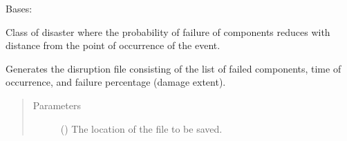 \documentclass[letterpaper,10pt,english]{sphinxmanual}
\begin{document}
\begin{fulllineitems}
\label{\detokenize{apidoc:dreaminsg_integrated_model.src.hazard_initiator.RadialDisruption}}
\sphinxAtStartPar
Bases: 

\sphinxAtStartPar
Class of disaster where the probability of failure of components reduces with distance from the point of occurrence of the event.

\begin{fulllineitems}
\label{\detokenize{apidoc:dreaminsg_integrated_model.src.hazard_initiator.RadialDisruption.generate_disruption_file}}
\sphinxAtStartPar
Generates the disruption file consisting of the list of failed components, time of occurrence, and failure percentage (damage extent).
\begin{quote}\begin{description}
\item[{Parameters}] \leavevmode
\sphinxAtStartPar
{} () \textendash{} The location of the file to be saved.

\end{description}\end{quote}

\end{fulllineitems}



\end{fulllineitems}
\end{document}
